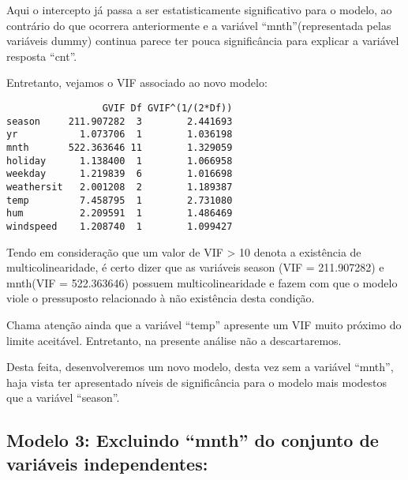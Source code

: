 \documentclass[
  letterpaper,
  DIV=11,
  numbers=noendperiod]{scrartcl}
\begin{document}
Aqui o intercepto já passa a ser estatisticamente significativo para o
modelo, ao contrário do que ocorrera anteriormente e a variável
``mnth''(representada pelas variáveis dummy) continua parece ter pouca
significância para explicar a variável resposta ``cnt''.

Entretanto, vejamos o VIF associado ao novo modelo:

\begin{verbatim}
                 GVIF Df GVIF^(1/(2*Df))
season     211.907282  3        2.441693
yr           1.073706  1        1.036198
mnth       522.363646 11        1.329059
holiday      1.138400  1        1.066958
weekday      1.219839  6        1.016698
weathersit   2.001208  2        1.189387
temp         7.458795  1        2.731080
hum          2.209591  1        1.486469
windspeed    1.208740  1        1.099427
\end{verbatim}

Tendo em consideração que um valor de VIF \textgreater{} 10 denota a
existência de multicolinearidade, é certo dizer que as variáveis season
(VIF = 211.907282) e mnth(VIF = 522.363646) possuem multicolinearidade e
fazem com que o modelo viole o pressuposto relacionado à não existência
desta condição.

Chama atenção ainda que a variável ``temp'' apresente um VIF muito
próximo do limite aceitável. Entretanto, na presente análise não a
descartaremos.

Desta feita, desenvolveremos um novo modelo, desta vez sem a variável
``mnth'', haja vista ter apresentado níveis de significância para o
modelo mais modestos que a variável ``season''.

\subsection{Modelo 3: Excluindo ``mnth'' do conjunto de variáveis
independentes:}\label{modelo-3-excluindo-mnth-do-conjunto-de-variuxe1veis-independentes}
\end{document}
